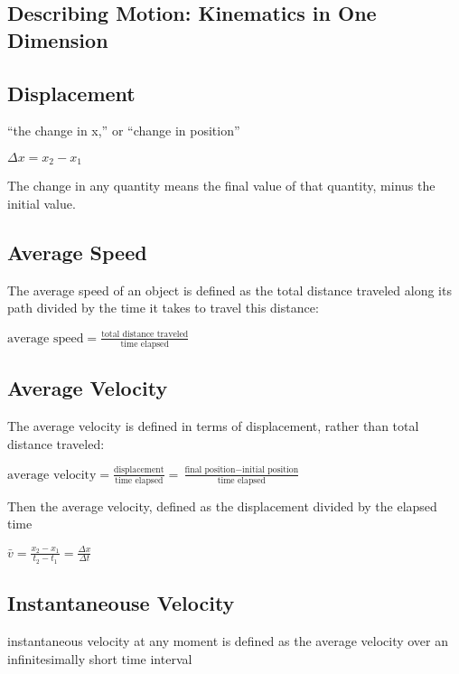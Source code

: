 \documentclass{extarticle}
\begin{document}
 
\begin{multicols}{4}




\setcounter{secnumdepth}{0}


\section{Describing Motion:
Kinematics in One Dimension}

\subsection{Displacement}
“the change in x,” or “change in position” 

$\Delta x = x_2 - x_1$

The change in any quantity means the final value of that quantity, minus the initial value.

\subsection{Average Speed}
The average speed of an object is defined as the total distance traveled along its path divided by the time it takes to travel this distance:

$\text{average speed} = \frac{\text{total distance traveled}}{\text{time elapsed}}$

\subsection{Average Velocity}
The average velocity is defined in terms of displacement, rather than total distance traveled:

$\text{average velocity} = \frac{ \text{displacement} }{ \text{time elapsed} } = \frac{ \text{final position} - \text{initial position} }{ \text{time elapsed} }$



Then the average velocity, defined as the displacement divided by the elapsed time

$\bar{v} = \frac{x_2 - x_1}{t_2 - t_1} = \frac{\Delta x}{\Delta t}$


\subsection{Instantaneouse Velocity}
instantaneous velocity at any moment is defined as the average velocity over an infinitesimally short time interval


\end{multicols}
\end{document}
